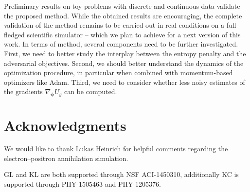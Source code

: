 \documentclass[twocolumn,superscriptaddress,aps]{revtex4-1}
\newcommand{\kcnote}[1]{\textcolor{red}{[KC: #1]}}
\newcommand{\bftheta}{{\bm \theta}}
\newcommand{\bfpsi}{{\bm \psi}}
\newcommand{\bfz}{\mathbf{z}}
\theoremstyle{plain}
\begin{document}
Preliminary results on toy problems with discrete and continuous data validate the proposed method.
While the obtained results are encouraging, the complete validation of the
method remains to be carried out in real conditions on a full fledged scientific
simulator -- which we plan to achieve for a next version of this work.
In terms of method, several components need to be further investigated.
First, we need to better study the interplay between the entropy penalty and the adversarial objectives.
Second, we should better understand the dynamics of the optimization
procedure, in particular when combined with momentum-based optimizers like Adam.
Third, we need to consider whether less noisy estimates of the gradients
$\nabla_\bfpsi U_g$ can be computed.





\section*{Acknowledgments}

We would like to thank Lukas Heinrich for helpful comments regarding
the electron--positron annihilation simulation.

GL and KL are both supported through NSF ACI-1450310, additionally KC is
supported through PHY-1505463 and PHY-1205376.



%


\end{document}
